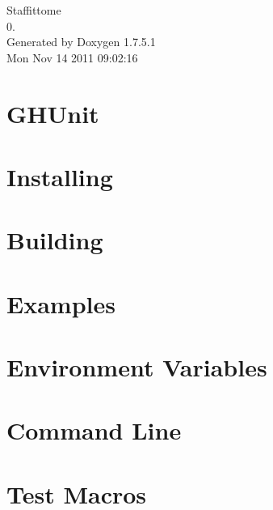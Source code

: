 \documentclass[a4paper]{book}
\begin{document}
\hypersetup{pageanchor=false,citecolor=blue}
\begin{titlepage}
\vspace*{7cm}
\begin{center}
{\Large \-Staffittome \\[1ex]\large 0. }\\
\vspace*{1cm}
{\large \-Generated by Doxygen 1.7.5.1}\\
\vspace*{0.5cm}
{\small Mon Nov 14 2011 09:02:16}\\
\end{center}
\end{titlepage}
\clearemptydoublepage
{}
\tableofcontents
\clearemptydoublepage
{}
\hypersetup{pageanchor=true,citecolor=blue}
\chapter{\-G\-H\-Unit}
\label{index}\hypertarget{index}{}
\chapter{\-Installing}
\label{Installing}
\hypertarget{Installing}{}

\chapter{\-Building}
\label{Building}
\hypertarget{Building}{}

\chapter{\-Examples}
\label{Examples}
\hypertarget{Examples}{}

\chapter{\-Environment \-Variables}
\label{EnvVariables}
\hypertarget{EnvVariables}{}

\chapter{\-Command \-Line}
\label{CommandLine}
\hypertarget{CommandLine}{}

\chapter{\-Test \-Macros}
\label{TestMacros}
\hypertarget{TestMacros}{}

\end{document}
